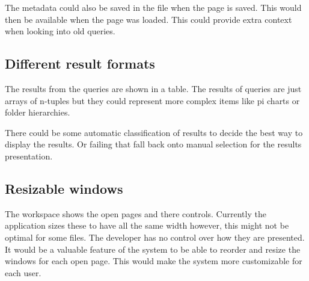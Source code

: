 The metadata could also be saved in the file when the page is saved.
This would then be available when the page was loaded. This could
provide extra context when looking into old queries.

\subsection{Different result formats}\label{different-result-formats}

The results from the queries are shown in a table. The results of
queries are just arrays of n-tuples but they could represent more
complex items like pi charts or folder hierarchies.

There could be some automatic classification of results to decide the
best way to display the results. Or failing that fall back onto manual
selection for the results presentation.

\subsection{Resizable windows}\label{resizable-windows}

The workspace shows the open pages and there controls. Currently the
application sizes these to have all the same width however, this might
not be optimal for some files. The developer has no control over how
they are presented. It would be a valuable feature of the system to be
able to reorder and resize the windows for each open page. This would
make the system more customizable for each user.
